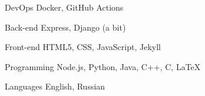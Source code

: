 

\begin{cvskills}

  \cvskill
    {DevOps} %
    {Docker, GitHub Actions} %

  \cvskill
    {Back-end} %
    {Express, Django (a bit)} %

  \cvskill
    {Front-end} %
    {HTML5, CSS, JavaScript, Jekyll} %

  \cvskill
    {Programming} %
    {Node.js, Python, Java, C++, C, LaTeX} %

  \cvskill
    {Languages} %
    {English, Russian} %

\end{cvskills}
